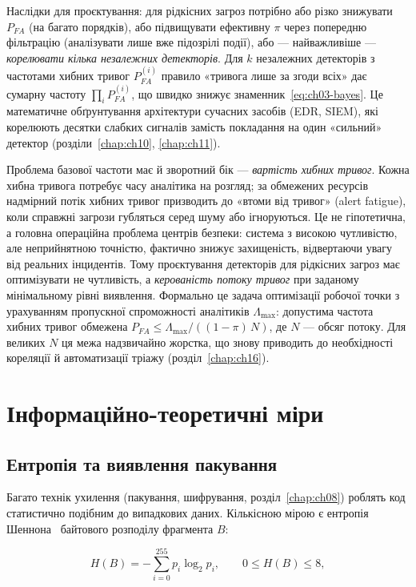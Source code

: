 Наслідки для проєктування: для рідкісних загроз потрібно або різко знижувати $P_{FA}$ (на багато порядків), або підвищувати ефективну $\pi$ через попередню фільтрацію (аналізувати лише вже підозрілі події), або --- найважливіше --- \emph{корелювати кілька незалежних детекторів}. Для $k$ незалежних детекторів з частотами хибних тривог $P_{FA}^{(i)}$ правило «тривога лише за згоди всіх» дає сумарну частоту $\prod_i P_{FA}^{(i)}$, що швидко знижує знаменник~\eqref{eq:ch03-bayes}. Це математичне обґрунтування архітектури сучасних засобів (EDR, SIEM), які корелюють десятки слабких сигналів замість покладання на один «сильний» детектор (розділи~\ref{chap:ch10}, \ref{chap:ch11}).

Проблема базової частоти має й зворотний бік --- \emph{вартість хибних тривог}. Кожна хибна тривога потребує часу аналітика на розгляд; за обмежених ресурсів надмірний потік хибних тривог призводить до «втоми від тривог» (alert fatigue), коли справжні загрози губляться серед шуму або ігноруються. Це не гіпотетична, а головна операційна проблема центрів безпеки: система з високою чутливістю, але неприйнятною точністю, фактично знижує захищеність, відвертаючи увагу від реальних інцидентів. Тому проєктування детекторів для рідкісних загроз має оптимізувати не чутливість, а \emph{керованість потоку тривог} при заданому мінімальному рівні виявлення. Формально це задача оптимізації робочої точки з урахуванням пропускної спроможності аналітиків $\Lambda_{\max}$: допустима частота хибних тривог обмежена $P_{FA} \le \Lambda_{\max}/((1-\pi)\,N)$, де $N$ --- обсяг потоку. Для великих $N$ ця межа надзвичайно жорстка, що знову приводить до необхідності кореляції й автоматизації тріажу (розділ~\ref{chap:ch16}).

\section{Інформаційно-теоретичні міри}\label{sec:ch03-entropy}

\subsection{Ентропія та виявлення пакування}

Багато технік ухилення (пакування, шифрування, розділ~\ref{chap:ch08}) роблять код статистично подібним до випадкових даних. Кількісною мірою є ентропія Шеннона~\cite{ch03:shannon} байтового розподілу фрагмента $B$:

\begin{equation}
H(B) = -\sum_{i=0}^{255} p_i \log_2 p_i,\qquad 0 \le H(B) \le 8,
\label{eq:ch03-entropy}
\end{equation}

